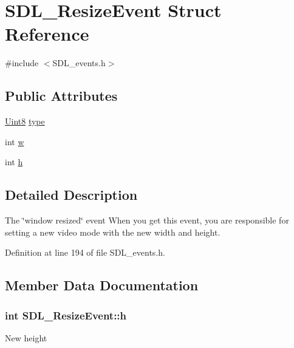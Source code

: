 \hypertarget{struct_s_d_l___resize_event}{}\section{S\+D\+L\+\_\+\+Resize\+Event Struct Reference}
\label{struct_s_d_l___resize_event}


{\ttfamily \#include $<$S\+D\+L\+\_\+events.\+h$>$}

\subsection*{Public Attributes}
\begin{DoxyCompactItemize}
\item 
\hyperlink{_s_d_l__stdinc_8h_a2944638813a090aa23e62f4da842c3e2}{Uint8} \hyperlink{struct_s_d_l___resize_event_a0f35cba640e999f4dd77e4267b812525}{type}
\item 
int \hyperlink{struct_s_d_l___resize_event_acd9eca9322c2d247bb0329e2ea97fc0f}{w}
\item 
int \hyperlink{struct_s_d_l___resize_event_a323addc213067775cccb1c1032aebf8b}{h}
\end{DoxyCompactItemize}


\subsection{Detailed Description}
The \char`\"{}window resized\char`\"{} event When you get this event, you are responsible for setting a new video mode with the new width and height. 

Definition at line 194 of file S\+D\+L\+\_\+events.\+h.



\subsection{Member Data Documentation}
\hypertarget{struct_s_d_l___resize_event_a323addc213067775cccb1c1032aebf8b}{}
\subsubsection[{h}]{\setlength{\rightskip}{0pt plus 5cm}int S\+D\+L\+\_\+\+Resize\+Event\+::h}\label{struct_s_d_l___resize_event_a323addc213067775cccb1c1032aebf8b}
New height 

